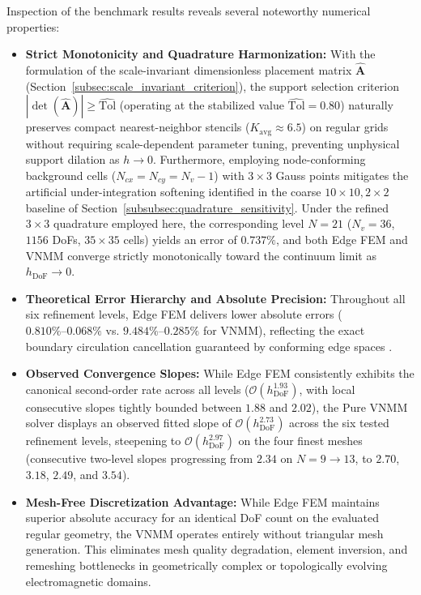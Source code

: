 \documentclass[preprint,12pt]{elsarticle}
\begin{document}
Inspection of the benchmark results reveals several noteworthy numerical properties:
\begin{itemize}
    \item \textbf{Strict Monotonicity and Quadrature Harmonization:} With the formulation of the scale-invariant dimensionless placement matrix $\widehat{\mathbf{A}}$ (Section~\ref{subsec:scale_invariant_criterion}), the support selection criterion $|\det(\widehat{\mathbf{A}})| \ge \widehat{\mathrm{Tol}}$ (operating at the stabilized value $\widehat{\mathrm{Tol}} = 0.80$) naturally preserves compact nearest-neighbor stencils ($K_{\mathrm{avg}} \approx 6.5$) on regular grids without requiring scale-dependent parameter tuning, preventing unphysical support dilation as $h \to 0$. Furthermore, employing node-conforming background cells ($N_{cx} = N_{cy} = N_v - 1$) with $3 \times 3$ Gauss points mitigates the artificial under-integration softening identified in the coarse $10 \times 10, 2 \times 2$ baseline of Section~\ref{subsubsec:quadrature_sensitivity}. Under the refined $3 \times 3$ quadrature employed here, the corresponding level $N = 21$ ($N_v = 36$, $1156$ DoFs, $35 \times 35$ cells) yields an error of $0.737\%$, and both Edge FEM and VNMM converge strictly monotonically toward the continuum limit as $h_{\mathrm{DoF}} \to 0$.
    \item \textbf{Theoretical Error Hierarchy and Absolute Precision:} Throughout all six refinement levels, Edge FEM delivers lower absolute errors ($0.810\%\text{--}0.068\%$ vs. $9.484\%\text{--}0.285\%$ for VNMM), reflecting the exact boundary circulation cancellation guaranteed by conforming edge spaces \cite{nedelec1980mixed, monk2003finite}.
    \item \textbf{Observed Convergence Slopes:} While Edge FEM consistently exhibits the canonical second-order rate across all levels ($\mathcal{O}(h_{\mathrm{DoF}}^{1.93})$, with local consecutive slopes tightly bounded between $1.88$ and $2.02$), the Pure VNMM solver displays an observed fitted slope of $\mathcal{O}(h_{\mathrm{DoF}}^{2.73})$ across the six tested refinement levels, steepening to $\mathcal{O}(h_{\mathrm{DoF}}^{2.97})$ on the four finest meshes (consecutive two-level slopes progressing from $2.34$ on $N=9 \to 13$, to $2.70$, $3.18$, $2.49$, and $3.54$).
    \item \textbf{Mesh-Free Discretization Advantage:} While Edge FEM maintains superior absolute accuracy for an identical DoF count on the evaluated regular geometry, the VNMM operates entirely without triangular mesh generation. This eliminates mesh quality degradation, element inversion, and remeshing bottlenecks in geometrically complex or topologically evolving electromagnetic domains.
\end{itemize}
\end{document}
